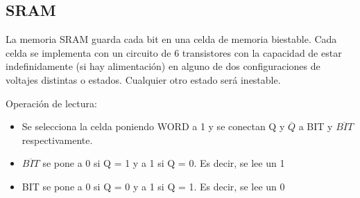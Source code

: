 \subsection{SRAM}
La memoria SRAM guarda cada bit en una celda de memoria biestable. Cada celda se implementa con 
un circuito de 6  transistores con la capacidad de estar indefinidamente (si hay alimentación) en alguno de dos configuraciones
de voltajes distintas o estados. Cualquier otro estado será inestable.
\begin{center}
    \begin{minipage}{0.4\textwidth}
        Operación de lectura: 
        \begin{itemize}
            \item Se selecciona la celda poniendo WORD a 1 y se conectan Q y $\overline{Q}$ a BIT y $\overline{BIT}$ respectivamente.
            \item $\overline{BIT}$ se pone a 0 si Q = 1 y a 1 si Q = 0. Es decir, se lee un 1
            \item BIT se pone a 0 si Q = 0 y a 1 si Q = 1. Es decir, se lee un 0
        \end{itemize}
    \end{minipage}
    \begin{minipage}{0.55\textwidth}
        
    \end{minipage}
\end{center}
